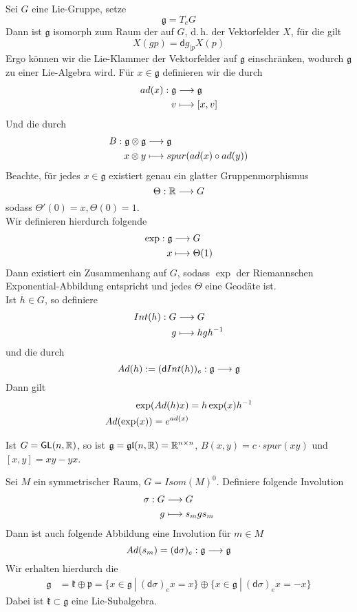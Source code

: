 \documentclass{book}
\renewcommand{\d}{\textsf{d}}
\newcommand{\g}{\mathfrak{g}}
\newcommand{\kf}{\mathfrak{k}}
\newcommand{\p}{\mathfrak{p}}
\newcommand{\GL}{\textsf{GL}(n,\R)}
\newcommand{\glf}{\mathfrak{gl}(n,\R)}
\begin{document}
\Bem{}
Sei $G$ eine Lie-Gruppe, setze
\[ \g = T_eG \]
Dann ist $\g$ isomorph zum Raum der  auf $G$, d.\,h. der Vektorfelder $X$, für die gilt
\[ X(gp) = \d g_{|p}X(p) \]
Ergo können wir die Lie-Klammer der Vektorfelder auf $\g$ einschränken, wodurch $\g$ zu einer Lie-Algebra wird. Für $x\in\g$ definieren wir die  durch
\begin{align*}
ad(x) : \g & \Pfeil{} \g\\
v & \longmapsto [x,v]
\end{align*}
Und die  durch
\begin{align*}
B : \g \otimes \g &\Pfeil{} \g\\
x \otimes y & \longmapsto spur(ad(x) \circ ad(y))
\end{align*}
Beachte, für jedes $x \in \g$ existiert genau ein glatter Gruppenmorphismus
\[ \Theta : \mathbb{R} \overset{}{\longrightarrow} G \]
sodass $\Theta'(0) = x, \Theta(0) = 1$.\\
Wir definieren hierdurch folgende 
\begin{align*}
\exp : \g &\Pfeil{} G\\
x &\longmapsto \Theta(1)
\end{align*}
Dann existiert ein Zusammenhang auf $G$, sodass $\exp$ der Riemannschen Exponential-Abbildung entspricht und jedes $\Theta$ eine Geodäte ist.\\
Ist $h\in G$, so definiere
\begin{align*}
Int(h) :G& \overset{}{\longrightarrow} G\\
g & \longmapsto hgh^{-1}
\end{align*}
und die  durch
\[ Ad(h) := (\d Int(h))_{e} : \g \Pfeil{} \g \]
Dann gilt
\begin{align*}
\exp(Ad(h)x) &= h\exp(x)h^{-1}\\
Ad(\exp(x)) = e^{ad(x)}
\end{align*}

\Bem{}
Ist $G = \GL$, so ist $\g = \glf = \R^{n\times n}$, $B(x,y) = c \cdot spur(xy)$ und $[x,y] = xy -yx$. 

\Bem{}
Sei $M$ ein symmetrischer Raum, $G = Isom(M)^0$. Definiere folgende Involution
\begin{align*}
\sigma : G &\overset{}{\longrightarrow} G\\
g &\longmapsto s_mgs_m
\end{align*}
Dann ist auch folgende Abbildung eine Involution für $m \in M$
\[ Ad(s_m) = (\d\sigma)_{e} : \g \Pfeil{} \g \]
Wir erhalten hierdurch die 
\begin{align*}
\g &= \kf \oplus \p = \{ x \in \g ~|~ (\d\sigma)_{e}x = x \} \oplus \{ x \in \g ~|~ (\d\sigma)_{e}x = -x \}
\end{align*}
Dabei ist $\kf \subset \g$ eine Lie-Subalgebra.
\end{document}
